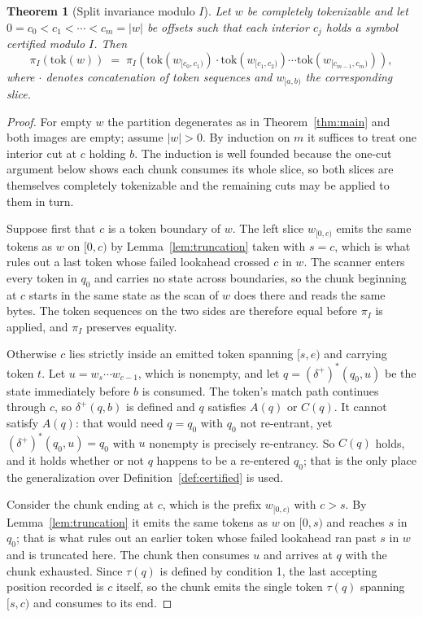 \documentclass[11pt,a4paper]{article}
\theoremstyle{definition}
\theoremstyle{plain}
\newtheorem{theorem}{Theorem}
\begin{document}
\begin{theorem}[Split invariance modulo $I$]
\label{thm:trivia}
Let $w$ be completely tokenizable and let $0 = c_0 < c_1 < \cdots < c_m = |w|$ be offsets such that each interior
$c_j$ holds a symbol certified modulo $I$. Then
\[
\pi_I(\mathrm{tok}(w)) \;=\; \pi_I\!\left(\mathrm{tok}(w_{[c_0,c_1)}) \cdot \mathrm{tok}(w_{[c_1,c_2)}) \cdots
\mathrm{tok}(w_{[c_{m-1},c_m)})\right),
\]
where $\cdot$ denotes concatenation of token sequences and $w_{[a,b)}$ the corresponding slice.
\end{theorem}

\begin{proof} For empty $w$ the partition degenerates as in Theorem~\ref{thm:main} and both images are empty; assume
$|w| > 0$. By induction on $m$ it suffices to treat one interior cut at $c$ holding $b$. The induction is well founded
because the one-cut argument below shows each chunk consumes its whole slice, so both slices are themselves completely
tokenizable and the remaining cuts may be applied to them in turn.

Suppose first that $c$ is a token boundary of $w$. The left slice $w_{[0,c)}$ emits the same tokens as $w$ on $[0,c)$
by Lemma~\ref{lem:truncation} taken with $s = c$, which is what rules out a last token whose failed lookahead crossed
$c$ in $w$. The scanner enters every token in $q_0$ and carries no state across boundaries, so the chunk beginning at
$c$ starts in the same state as the scan of $w$ does there and reads the same bytes. The token sequences on the two
sides are therefore equal before $\pi_I$ is applied, and $\pi_I$ preserves equality.

Otherwise $c$ lies strictly inside an emitted token spanning $[s, e)$ and carrying token $t$. Let $u = w_s \cdots
w_{c-1}$, which is nonempty, and let $q = (\delta^+)^*(q_0, u)$ be the state immediately before $b$ is consumed. The
token's match path continues through $c$, so $\delta^+(q, b)$ is defined and $q$ satisfies $A(q)$ or $C(q)$. It cannot
satisfy $A(q)$: that would need $q = q_0$ with $q_0$ not re-entrant, yet $(\delta^+)^*(q_0, u) = q_0$ with $u$
nonempty is precisely re-entrancy. So $C(q)$ holds, and it holds whether or not $q$ happens to be a re-entered $q_0$;
that is the only place the generalization over Definition~\ref{def:certified} is used.

Consider the chunk ending at $c$, which is the prefix $w_{[0,c)}$ with $c > s$. By Lemma~\ref{lem:truncation} it emits
the same tokens as $w$ on $[0, s)$ and reaches $s$ in $q_0$; that is what rules out an earlier token whose failed
lookahead ran past $s$ in $w$ and is truncated here. The chunk then consumes $u$ and arrives at $q$ with the chunk
exhausted. Since $\tau(q)$ is defined by condition 1, the last accepting position recorded is $c$ itself, so the chunk
emits the single token $\tau(q)$ spanning $[s, c)$ and consumes to its end.


\end{proof}
\end{document}
